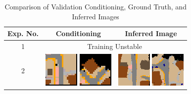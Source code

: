 \documentclass{article}
\begin{document}
\begin{table}
\centering
\caption{Comparison of Validation Conditioning, Ground Truth, and Inferred Images}
\begin{tabular}{c | c | c}
\textbf{Exp. No.} & \textbf{Conditioning} & \textbf{Inferred Image} \\
\midrule

1 & \multicolumn{2}{c}{Training Unstable} \\
\midrule

2 &
\includegraphics[width=0.15\linewidth]{images/val_conditioning1_exp2.png}
\includegraphics[width=0.15\linewidth]{images/val_conditioning2_exp2.png}
&
\includegraphics[width=0.15\linewidth]{images/val_inferred1_exp2.png}
\includegraphics[width=0.15\linewidth]{images/val_inferred2_exp2.png}
\\
\midrule


\end{tabular}
\end{table}
\end{document}
